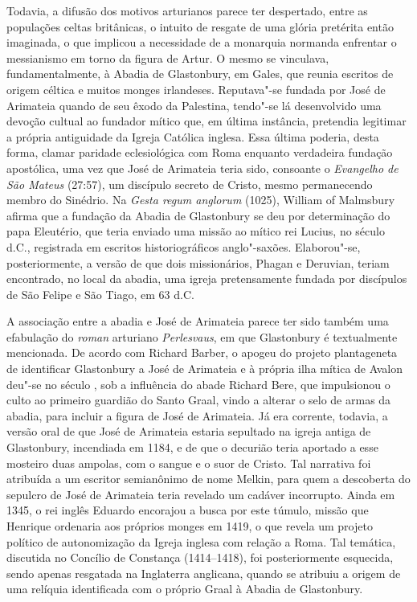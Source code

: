 Todavia, a difusão dos motivos arturianos parece ter despertado, entre as
populações celtas britânicas, o intuito de resgate de uma glória pretérita então
imaginada, o que implicou a necessidade de a monarquia normanda enfrentar o
messianismo em torno da figura de Artur. O mesmo se vinculava,
fundamentalmente, à Abadia de Glastonbury, em Gales, que reunia escritos de
origem céltica e muitos monges irlandeses. Reputava"-se fundada por José de
Arimateia quando de seu êxodo da Palestina, tendo"-se lá desenvolvido uma
devoção cultual ao fundador mítico que, em última instância, pretendia
legitimar a própria antiguidade da Igreja Católica inglesa. Essa última
poderia, desta forma, clamar paridade eclesiológica com Roma enquanto
verdadeira fundação apostólica, uma vez que José de Arimateia teria sido,
consoante o \textit{Evangelho de São Mateus} (27:57), um discípulo secreto de
Cristo, mesmo permanecendo membro do Sinédrio. Na \textit{Gesta regum
anglorum} (1025), William of Malmsbury afirma que a fundação da Abadia de Glastonbury
se deu por determinação do papa Eleutério, que teria enviado uma missão ao
mítico rei Lucius, no século  d.C., registrada em escritos historiográficos
anglo"-saxões. Elaborou"-se, posteriormente, a versão de que dois missionários,
Phagan e Deruvian, teriam encontrado, no local da abadia, uma igreja
pretensamente fundada por discípulos de São Felipe e São Tiago, em 63 d.C.

A associação entre a abadia e José de Arimateia parece ter sido também uma
efabulação do \textit{roman} arturiano \textit{Perlesvaus}, em que Glastonbury
é textualmente mencionada. De acordo com Richard Barber, o apogeu do projeto
plantageneta de identificar Glastonbury a José de Arimateia e à própria ilha
mítica de Avalon deu"-se no século , sob a influência do abade Richard Bere,
que impulsionou o culto ao primeiro guardião do Santo Graal, vindo a alterar o
selo de armas da abadia, para incluir a figura de José de Arimateia. Já era
corrente, todavia, a versão oral de que José de Arimateia estaria sepultado na igreja
antiga de Glastonbury, incendiada em 1184, e de que o decurião teria aportado a
esse mosteiro duas ampolas, com o sangue e o suor de Cristo. Tal narrativa foi
atribuída a um escritor semianônimo de nome Melkin, para quem a descoberta do
sepulcro de José de Arimateia teria revelado um cadáver incorrupto. Ainda em 1345, o
rei inglês Eduardo  encorajou a busca por este túmulo, missão que Henrique 
ordenaria aos próprios monges em 1419, o que revela um projeto político de
autonomização da Igreja inglesa com relação a Roma. Tal temática, discutida no
Concílio de Constança (1414--1418), foi posteriormente esquecida, sendo apenas
resgatada na Inglaterra anglicana, quando se atribuiu a origem de uma relíquia
identificada com o próprio Graal à Abadia de Glastonbury.

